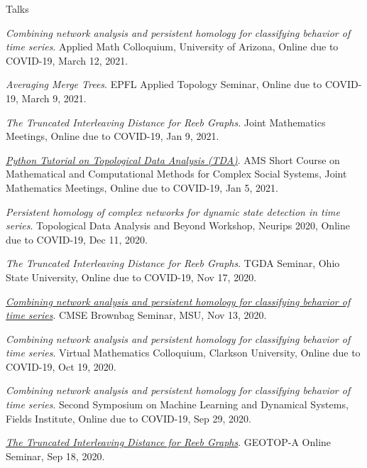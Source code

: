 \documentclass{resume} %
\begin{document}
\begin{rSection}{Talks}
\begin{etaremune}
\item\emph{Combining network analysis and persistent homology for classifying behavior of time series}. Applied Math Colloquium, University of Arizona, Online due to COVID-19, March 12, 2021. 

\item\emph{Averaging Merge Trees}. EPFL Applied Topology Seminar, Online due to COVID-19, March 9, 2021. 

\item\emph{The Truncated Interleaving Distance for Reeb Graphs}. Joint Mathematics Meetings, Online due to COVID-19, Jan 9, 2021. 

\item\emph{\href{https://github.com/lizliz/TDA-Python-Workshop-JMM21}{Python Tutorial on Topological Data Analysis (TDA)}}. AMS Short Course on Mathematical and Computational Methods for Complex Social Systems, Joint Mathematics Meetings, Online due to COVID-19, Jan 5, 2021. 

\item\emph{Persistent homology of complex networks for dynamic state detection in time series}. Topological Data Analysis and Beyond Workshop, Neurips 2020, Online due to COVID-19, Dec 11, 2020. 

\item\emph{The Truncated Interleaving Distance for Reeb Graphs}. TGDA Seminar, Ohio State University, Online due to COVID-19, Nov 17, 2020. 

\item\emph{\href{https://mediaspace.msu.edu/media/t/1_yghdjfiz}{Combining network analysis and persistent homology for classifying behavior of time series}}. CMSE Brownbag Seminar, MSU, Nov 13, 2020. 

\item\emph{Combining network analysis and persistent homology for classifying behavior of time series}. Virtual Mathematics Colloquium, Clarkson University, Online due to COVID-19, Oct 19, 2020. 

\item\emph{Combining network analysis and persistent homology for classifying behavior of time series}. Second Symposium on Machine Learning and Dynamical Systems, Fields Institute, Online due to COVID-19, Sep 29, 2020. 

\item\emph{\href{https://youtu.be/nyO4KQTmwzU}{The Truncated Interleaving Distance for Reeb Graphs}}. GEOTOP-A Online Seminar, Sep 18, 2020. 


\end{etaremune}
\end{rSection}
\end{document}
